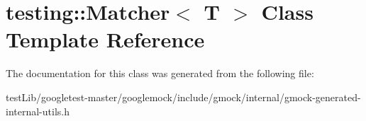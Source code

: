 \hypertarget{classtesting_1_1Matcher}{}\section{testing\+:\+:Matcher$<$ T $>$ Class Template Reference}
\label{classtesting_1_1Matcher}


The documentation for this class was generated from the following file\+:\begin{DoxyCompactItemize}
\item 
test\+Lib/googletest-\/master/googlemock/include/gmock/internal/gmock-\/generated-\/internal-\/utils.\+h\end{DoxyCompactItemize}

